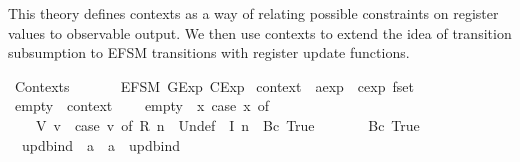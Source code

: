 %
\begin{isabellebody}%
%
%
\isadelimdocument
%
\endisadelimdocument
%
\isatagdocument
%
\isamarkuptrue%
%
\endisatagdocument
{\isafolddocument}%
%
\isadelimdocument
%
\endisadelimdocument
%
\begin{isamarkuptext}%
This theory defines contexts as a way of relating possible constraints on register values to
observable output. We then use contexts to extend the idea of transition subsumption to EFSM
transitions with register update functions.%
\end{isamarkuptext}\isamarkuptrue%
%
\isadelimtheory
%
\endisadelimtheory
%
\isatagtheory
{}\isamarkupfalse%
\ Contexts\isanewline
\ \ \isanewline
\ \ \ \ EFSM\ GExp\ CExp\isanewline
{}%
\endisatagtheory
{\isafoldtheory}%
%
\isadelimtheory
%
\endisadelimtheory
\isanewline
\isanewline
{}\isamarkupfalse%
\ {\isachardoublequoteopen}context{\isachardoublequoteclose}\ {\isacharequal}\ {\isachardoublequoteopen}aexp\ {\isasymRightarrow}\ cexp\ fset{\isachardoublequoteclose}\isanewline
\isanewline
\isanewline
{}\isamarkupfalse%
\ empty\ {\isacharcolon}{\isacharcolon}\ {\isachardoublequoteopen}context{\isachardoublequoteclose}\ {\isacharparenleft}{\isachardoublequoteopen}{\isasymlbrakk}{\isasymrbrakk}{\isachardoublequoteclose}{\isacharparenright}\ \isanewline
\ \ {\isachardoublequoteopen}empty\ {\isasymequiv}\ {\isacharparenleft}{\isasymlambda}x{\isachardot}\ case\ x\ of\isanewline
\ \ \ \ {\isacharparenleft}V\ v{\isacharparenright}\ {\isasymRightarrow}\ {\isacharparenleft}case\ v\ of\ R\ n\ {\isasymRightarrow}\ {\isacharbraceleft}{\isacharbar}Undef{\isacharbar}{\isacharbraceright}\ {\isacharbar}\ I\ n\ {\isasymRightarrow}\ {\isacharbraceleft}{\isacharbar}Bc\ True{\isacharbar}{\isacharbraceright}{\isacharparenright}\ {\isacharbar}\isanewline
\ \ \ \ {\isacharunderscore}\ {\isasymRightarrow}\ {\isacharbraceleft}{\isacharbar}Bc\ True{\isacharbar}{\isacharbraceright}\isanewline
\ \ {\isacharparenright}{\isachardoublequoteclose}\isanewline
{}\isamarkupfalse%
\isanewline
\ \ {\isachardoublequoteopen}{\isacharunderscore}updbind{\isachardoublequoteclose}\ {\isacharcolon}{\isacharcolon}\ {\isachardoublequoteopen}{\isacharprime}a\ {\isasymRightarrow}\ {\isacharprime}a\ {\isasymRightarrow}\ updbind{\isachardoublequoteclose}\ {\isacharparenleft}{\isachardoublequoteopen}{\isacharparenleft}{}{\isacharunderscore}\ {\isasymmapsto}{\isacharslash}\ {\isacharunderscore}{\isacharparenright}{\isachardoublequoteclose}{\isacharparenright}\isanewline

\end{isabellebody}
